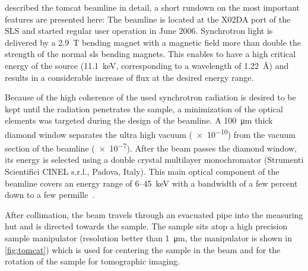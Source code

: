 \citet{Stampanoni2006a} described the \ac{tomcat} beamline in detail, a short rundown on the most important features are presented here: The beamline is located at the X02DA port of the SLS and started regular user operation in June 2006. Synchrotron light is delivered by a \SI{2.9}{\tesla} bending magnet with a magnetic field more than double the strength of the normal \ac{sls} bending magnets. This enables to have a high critical energy of the source (\SI{11.1}{\kilo\electronvolt}, corresponding to a wavelength of \SI{1.22}{\angstrom}) and results in a considerable increase of flux at the desired energy range.

Because of the high coherence of the used synchrotron radiation is desired to be kept until the radiation penetrates the sample, a minimization of the optical elements was targeted during the design of the beamline. A \SI{100}{\micro\meter} thick diamond window separates the ultra high vacuum (\SI{e-10}{\millibar}) from the vacuum section of the beamline (\SI{e-7}{\millibar}). After the beam passes the diamond window, its energy is selected using a double crystal multilayer monochromator (Strumenti Scientifici CINEL s.r.l., Padova, Italy). This main optical component of the beamline covers an energy range of 6--\SI{45}{\kilo\electronvolt} with a bandwidth of a few percent down to a few permille~\cite{Stampanoni2006a}.

After collimation, the beam travels through an evacuated pipe into the measuring hut and is directed towards the sample. The sample sits atop a high precision sample manipulator (resolution better than \SI{1}{\micro\meter}, the manipulator is shown in \autoref{fig:tomcat}) which is used for centering the sample in the beam and for the rotation of the sample for tomographic imaging. 

